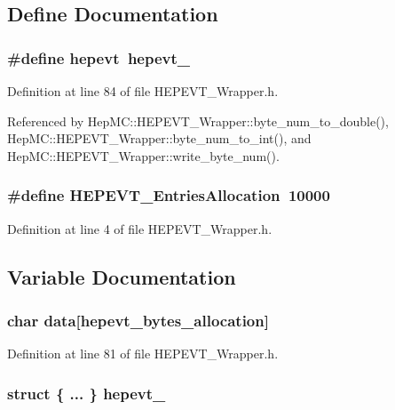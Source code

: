 \subsection{Define Documentation}
\subsubsection{\setlength{\rightskip}{0pt plus 5cm}\#define hepevt~{\bf hepevt\_\-}}\label{HEPEVT__Wrapper_8h_25d5c077d382132db52a5ef5ac714218}




Definition at line 84 of file HEPEVT\_\-Wrapper.h.

Referenced by Hep\-MC::HEPEVT\_\-Wrapper::byte\_\-num\_\-to\_\-double(), Hep\-MC::HEPEVT\_\-Wrapper::byte\_\-num\_\-to\_\-int(), and Hep\-MC::HEPEVT\_\-Wrapper::write\_\-byte\_\-num().
\subsubsection{\setlength{\rightskip}{0pt plus 5cm}\#define HEPEVT\_\-Entries\-Allocation~10000}\label{HEPEVT__Wrapper_8h_71150dd9fbcd08fa6fbd49cef71e6ce4}




Definition at line 4 of file HEPEVT\_\-Wrapper.h.

\subsection{Variable Documentation}
\subsubsection{\setlength{\rightskip}{0pt plus 5cm}char {\bf data}[{\bf hepevt\_\-bytes\_\-allocation}]}\label{HEPEVT__Wrapper_8h_b1db9d259d33c5b95fa7ecf28fa822d0}




Definition at line 81 of file HEPEVT\_\-Wrapper.h.
\subsubsection{\setlength{\rightskip}{0pt plus 5cm}struct \{ ... \}   {\bf hepevt\_\-}}\label{HEPEVT__Wrapper_8h_571712e9b2670a2759a5ed6984825410}


